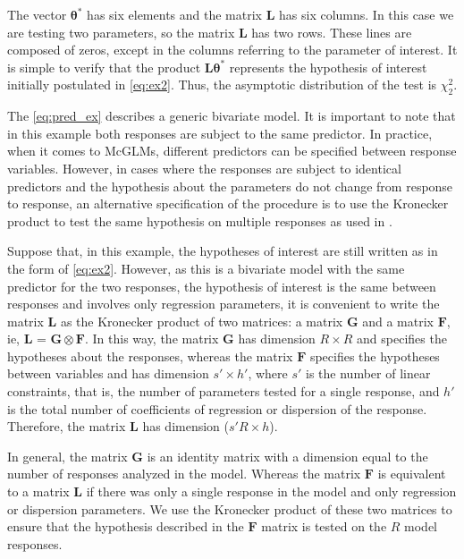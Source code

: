 \documentclass[article]{jss}\usepackage[]{graphicx}\usepackage[]{xcolor}
\begin{document}
The vector $\boldsymbol{\theta^{*}}$ has six elements and the matrix $\boldsymbol{L}$ has six columns. In this case we are testing two parameters, so the matrix $\boldsymbol{L}$ has two rows. These lines are composed of zeros, except in the columns referring to the parameter of interest. It is simple to verify that the product $\boldsymbol{L}\boldsymbol{\theta^{*}}$ represents the hypothesis of interest initially postulated in \autoref{eq:ex2}. Thus, the asymptotic distribution of the test is $\chi^2_2$.

The \autoref{eq:pred_ex} describes a generic bivariate model. It is important to note that in this example both responses are subject to the same predictor. In practice, when it comes to McGLMs, different predictors can be specified between response variables. However, in cases where the responses are subject to identical predictors and the hypothesis about the parameters do not change from response to response, an alternative specification of the procedure is to use the Kronecker product to test the same hypothesis on multiple responses as used in \citet{plastic}.

Suppose that, in this example, the hypotheses of interest are still written as in the form of \autoref{eq:ex2}. However, as this is a bivariate model with the same predictor for the two responses, the hypothesis of interest is the same between responses and involves only regression parameters, it is convenient to write the matrix $\boldsymbol{L}$ as the Kronecker product of two matrices: a matrix $\boldsymbol{G}$ and a matrix $\boldsymbol{F}$, ie, $\boldsymbol{L}$ = $\boldsymbol{G} \otimes \boldsymbol{F}$. In this way, the matrix $\boldsymbol{G}$ has dimension $R \times R$ and specifies the hypotheses about the responses, whereas the matrix $\boldsymbol{F}$ specifies the hypotheses between variables and has dimension ${s}' \times {h}'$, where ${s}'$ is the number of linear constraints, that is, the number of parameters tested for a single response, and ${h}'$ is the total number of coefficients of regression or dispersion of the response. Therefore, the matrix $\boldsymbol{L}$ has dimension (${s}'R \times h$).

In general, the matrix $\boldsymbol{G}$ is an identity matrix with a dimension equal to the number of responses analyzed in the model. Whereas the matrix $\boldsymbol{F}$ is equivalent to a matrix $\boldsymbol{L}$ if there was only a single response in the model and only regression or dispersion parameters. We use the Kronecker product of these two matrices to ensure that the hypothesis described in the $\boldsymbol{F}$ matrix is tested on the $R$ model responses.
\end{document}
